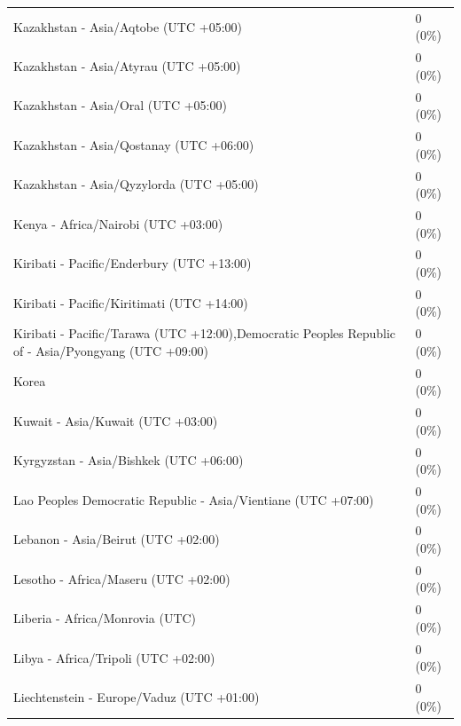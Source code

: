 \begin{appendix}
\begin{table}
{\begin{tabular}[t]{ll}
\hspace{1em}Kazakhstan - Asia/Aqtobe (UTC +05:00) & 0 (0\%)\\
\hspace{1em}Kazakhstan - Asia/Atyrau (UTC +05:00) & 0 (0\%)\\
\hspace{1em}Kazakhstan - Asia/Oral (UTC +05:00) & 0 (0\%)\\
\hspace{1em}Kazakhstan - Asia/Qostanay (UTC +06:00) & 0 (0\%)\\
\addlinespace
\hspace{1em}Kazakhstan - Asia/Qyzylorda (UTC +05:00) & 0 (0\%)\\
\hspace{1em}Kenya - Africa/Nairobi (UTC +03:00) & 0 (0\%)\\
\hspace{1em}Kiribati - Pacific/Enderbury (UTC +13:00) & 0 (0\%)\\
\hspace{1em}Kiribati - Pacific/Kiritimati (UTC +14:00) & 0 (0\%)\\
\hspace{1em}Kiribati - Pacific/Tarawa (UTC +12:00),Democratic Peoples Republic of - Asia/Pyongyang (UTC +09:00) & 0 (0\%)\\
\addlinespace
\hspace{1em}Korea & 0 (0\%)\\
\hspace{1em}Kuwait - Asia/Kuwait (UTC +03:00) & 0 (0\%)\\
\hspace{1em}Kyrgyzstan - Asia/Bishkek (UTC +06:00) & 0 (0\%)\\
\hspace{1em}Lao Peoples Democratic Republic - Asia/Vientiane (UTC +07:00) & 0 (0\%)\\
\hspace{1em}Lebanon - Asia/Beirut (UTC +02:00) & 0 (0\%)\\
\addlinespace
\hspace{1em}Lesotho - Africa/Maseru (UTC +02:00) & 0 (0\%)\\
\hspace{1em}Liberia - Africa/Monrovia (UTC) & 0 (0\%)\\
\hspace{1em}Libya - Africa/Tripoli (UTC +02:00) & 0 (0\%)\\
\hspace{1em}Liechtenstein - Europe/Vaduz (UTC +01:00) & 0 (0\%)\\

\end{tabular}}
\end{table}
\end{appendix}
